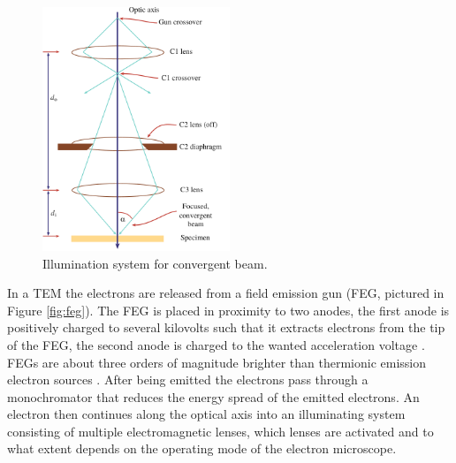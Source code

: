 \begin{figure}
    \centering
    \includegraphics[width=0.5\textwidth, keepaspectratio]{resources/Figures/stem_operating.png}
    \caption{Illumination system for convergent beam.}
    \label{fig:stem_operating}
\end{figure}

In a TEM the electrons are released from a field emission gun (FEG, pictured in Figure \ref{fig:feg}). 
The FEG is placed in proximity to two anodes, the first anode is positively charged to several kilovolts such that it extracts electrons from the tip of the FEG, the second anode is charged to the wanted acceleration voltage \cite{Williams2009-ww}.
FEGs are about three orders of magnitude brighter than thermionic emission electron sources \cite{field-emission}.
After being emitted the electrons pass through a monochromator that reduces the energy spread of the emitted electrons. An electron then continues along the optical axis into an illuminating system consisting of multiple electromagnetic lenses, which lenses are activated and to what extent depends on the operating mode of the electron microscope.

